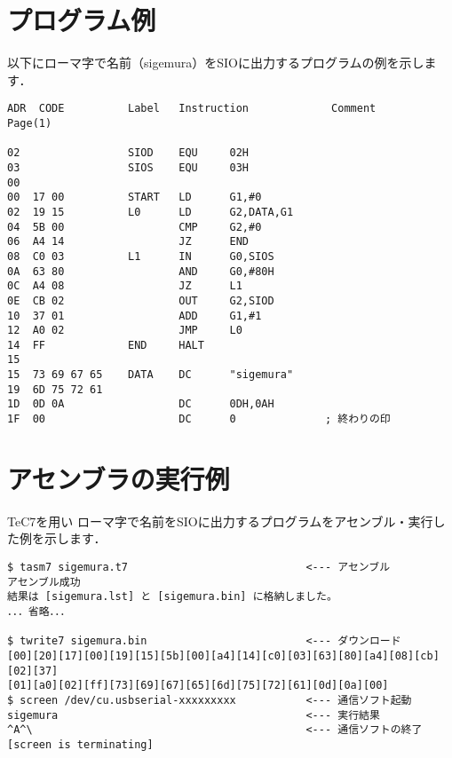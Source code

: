 \newpage
\section{プログラム例}
以下にローマ字で名前（sigemura）をSIOに出力するプログラムの例を示します．

\begin{center}
\begin{verbatim}
ADR  CODE          Label   Instruction             Comment              Page(1)

02                 SIOD    EQU     02H            
03                 SIOS    EQU     03H            
00                 
00  17 00          START   LD      G1,#0          
02  19 15          L0      LD      G2,DATA,G1     
04  5B 00                  CMP     G2,#0          
06  A4 14                  JZ      END            
08  C0 03          L1      IN      G0,SIOS        
0A  63 80                  AND     G0,#80H        
0C  A4 08                  JZ      L1             
0E  CB 02                  OUT     G2,SIOD        
10  37 01                  ADD     G1,#1          
12  A0 02                  JMP     L0             
14  FF             END     HALT                   
15                 
15  73 69 67 65    DATA    DC      "sigemura"     
19  6D 75 72 61 
1D  0D 0A                  DC      0DH,0AH        
1F  00                     DC      0              ; 終わりの印
\end{verbatim}
\end{center}

\section{アセンブラの実行例}
TeC7を用い
ローマ字で名前をSIOに出力するプログラムをアセンブル・実行した例を示します．

\begin{center}
\begin{verbatim}
$ tasm7 sigemura.t7                            <--- アセンブル
アセンブル成功
結果は [sigemura.lst] と [sigemura.bin] に格納しました。
．．．省略．．．

$ twrite7 sigemura.bin                         <--- ダウンロード
[00][20][17][00][19][15][5b][00][a4][14][c0][03][63][80][a4][08][cb][02][37]
[01][a0][02][ff][73][69][67][65][6d][75][72][61][0d][0a][00]
$ screen /dev/cu.usbserial-xxxxxxxxx           <--- 通信ソフト起動
sigemura                                       <--- 実行結果
^A^\                                           <--- 通信ソフトの終了
[screen is terminating]
\end{verbatim}
\end{center}

